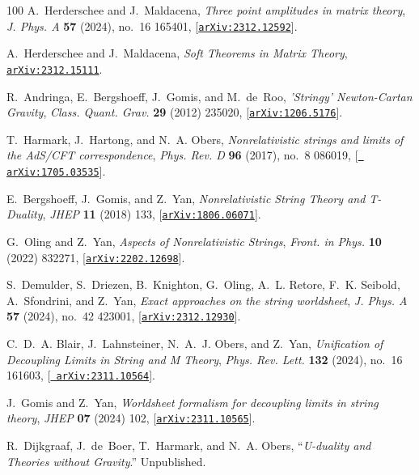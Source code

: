 \documentclass[11pt]{article}
\renewcommand{\emph}[1]{\textit{#1}}
\begin{document}
\begin{thebibliography}{100}
A.~Herderschee and J.~Maldacena, {\it {Three point amplitudes in matrix
  theory}},  {\em J. Phys. A} {\bf 57} (2024), no.~16 165401,
  [\href{http://arxiv.org/abs/2312.12592}{{\tt arXiv:2312.12592}}].

A.~Herderschee and J.~Maldacena, {\it {Soft Theorems in Matrix Theory}},
  \href{http://arxiv.org/abs/2312.15111}{{\tt arXiv:2312.15111}}.

R.~Andringa, E.~Bergshoeff, J.~Gomis, and M.~de~Roo, {\it {'Stringy'
  Newton-Cartan Gravity}},  {\em Class. Quant. Grav.} {\bf 29} (2012) 235020,
  [\href{http://arxiv.org/abs/1206.5176}{{\tt arXiv:1206.5176}}].

T.~Harmark, J.~Hartong, and N.~A. Obers, {\it {Nonrelativistic strings and
  limits of the AdS/CFT correspondence}},  {\em Phys. Rev. D} {\bf 96} (2017),
  no.~8 086019, [\href{http://arxiv.org/abs/1705.03535}{{\tt
  arXiv:1705.03535}}].

E.~Bergshoeff, J.~Gomis, and Z.~Yan, {\it {Nonrelativistic String Theory and
  T-Duality}},  {\em JHEP} {\bf 11} (2018) 133,
  [\href{http://arxiv.org/abs/1806.06071}{{\tt arXiv:1806.06071}}].

G.~Oling and Z.~Yan, {\it {Aspects of Nonrelativistic Strings}},  {\em Front.
  in Phys.} {\bf 10} (2022) 832271,
  [\href{http://arxiv.org/abs/2202.12698}{{\tt arXiv:2202.12698}}].

S.~Demulder, S.~Driezen, B.~Knighton, G.~Oling, A.~L. Retore, F.~K. Seibold,
  A.~Sfondrini, and Z.~Yan, {\it {Exact approaches on the string worldsheet}},
  {\em J. Phys. A} {\bf 57} (2024), no.~42 423001,
  [\href{http://arxiv.org/abs/2312.12930}{{\tt arXiv:2312.12930}}].

C.~D.~A. Blair, J.~Lahnsteiner, N.~A.~J. Obers, and Z.~Yan, {\it {Unification
  of Decoupling Limits in String and M Theory}},  {\em Phys. Rev. Lett.} {\bf
  132} (2024), no.~16 161603, [\href{http://arxiv.org/abs/2311.10564}{{\tt
  arXiv:2311.10564}}].

J.~Gomis and Z.~Yan, {\it {Worldsheet formalism for decoupling limits in string
  theory}},  {\em JHEP} {\bf 07} (2024) 102,
  [\href{http://arxiv.org/abs/2311.10565}{{\tt arXiv:2311.10565}}].

R.~Dijkgraaf, J.~de~Boer, T.~Harmark, and N.~A. Obers, ``\emph{U-duality and
  Theories without Gravity}.'' Unpublished.


\end{thebibliography}
\end{document}
